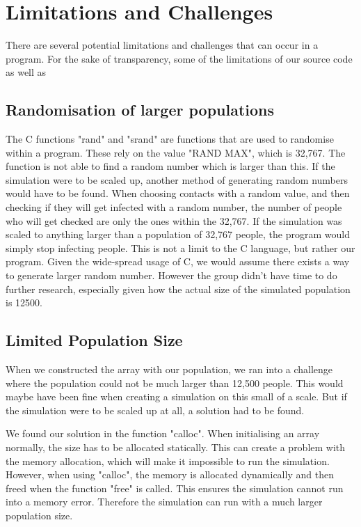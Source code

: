 \section{Limitations and Challenges} \label{sec: limitations and challenges}

There are several potential limitations and challenges that can occur in a program. For the sake of transparency, some of the limitations of our source code as well as 

\subsection{Randomisation of larger populations}

The C functions "rand" and "srand" are functions that are used to randomise within a program. These rely on the value "RAND MAX", which is 32,767. The function is not able to find a random number which is larger than this. If the simulation were to be scaled up, another method of generating random numbers would have to be found. When choosing contacts with a random value, and then checking if they will get infected with a random number, the number of people who will get checked are only the ones within the 32,767. If the simulation was scaled to anything larger than a population of 32,767 people, the program would simply stop infecting people. This is not a limit to the C language, but rather our program. Given the wide-spread usage of C, we would assume there exists a way to generate larger random number. However the group didn't have time to do further research, especially given how the actual size of the simulated population is 12500.

\subsection{Limited Population Size}

When we constructed the array with our population, we ran into a challenge where the population could not be much larger than 12,500 people. This would maybe have been fine when creating a simulation on this small of a scale. But if the simulation were to be scaled up at all, a solution had to be found.

We found our solution in the function "calloc". When initialising an array normally, the size has to be allocated statically. This can create a problem with the memory allocation, which will make it impossible to run the simulation. However, when using "calloc", the memory is allocated dynamically and then freed when the function "free" is called. This ensures the simulation cannot run into a memory error. Therefore the simulation can run with a much larger population size.

